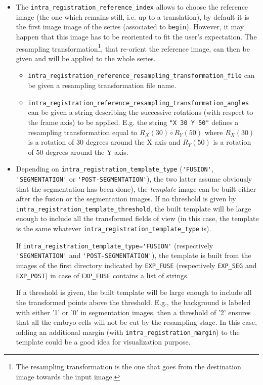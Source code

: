 \begin{itemize}
\itemsep -0.5ex

\item The \verb|intra_registration_reference_index| allows to choose the reference image (the one which remains still, i.e. up to a translation), by default it is the first image image of the series (associated to \verb|begin|). 
However, it may happen that this image has to be reoriented to fit the user's expectation. The resampling transformation\footnote{The resampling transformation is the one that goes from the destination image towards the input image.}, that re-orient the reference image, can then be given and will be applied to the whole series.
\begin{itemize}
\itemsep -0.5ex
\item \verb|intra_registration_reference_resampling_transformation_file| can be given a resampling transformation file name.
\item \verb|intra_registration_reference_resampling_transformation_angles| can be given a string describing the successive rotations (with respect to the frame axis) to be applied. E.g. the string \verb|"X 30 Y 50"| defines a resampling transformation equal to $R_X(30) \circ R_Y(50)$ where $R_X(30)$ is a rotation of 30 degrees around the X axis and $R_Y(50)$ is a rotation of 50 degrees around the Y axis.
\end{itemize}

\item Depending on \verb|intra_registration_template_type| (\verb|'FUSION'|,
\verb|'SEGMENTATION'| or \verb|'POST-SEGMENTATION'|), the two latter
assume obviously that the segmentation has been done), the
\textit{template} image can be built either after the fusion or the
segmentation images. If no threshold is given by
\verb|intra_registration_template_threshold|, the built template will
be large enough to include all the transformed fields of view (in this
case, the template is the same whatever
\verb|intra_registration_template_type| is).

If \verb|intra_registration_template_type='FUSION'| (respectively
\verb|'SEGMENTATION'| and \verb|'POST-SEGMENTATION'|),  the template
is built from the images of the first directory indicated by
\texttt{EXP\_FUSE} (respectively
\texttt{EXP\_SEG} and \texttt{EXP\_POST}) in case of
\texttt{EXP\_FUSE} contains a list of strings.

If a threshold is given, the built template will be large enough to
include all the transformed points above the threshold. E.g., the
background is labeled with either '1' or '0' in segmentation images,
then a threshold of '2' ensures that all the embryo cells will not be
cut by the resampling stage.  In this case, adding an additional
margin (with \verb|intra_registration_margin|) to the template could be a good idea for visualization
purpose. 


\end{itemize}
